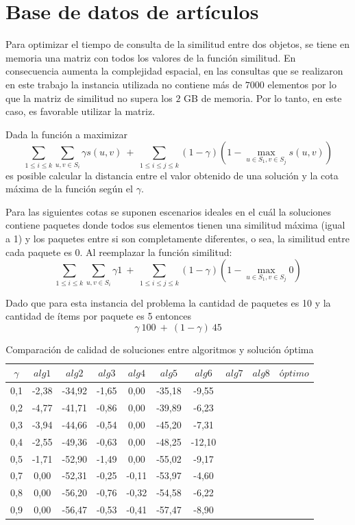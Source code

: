 \section{Base de datos de artículos}
Para optimizar el tiempo de consulta de la similitud entre dos objetos, se tiene en memoria una matriz con todos los valores de la función similitud. En consecuencia aumenta la complejidad espacial, en las consultas que se realizaron en este trabajo la instancia utilizada no contiene más de $7000$ elementos por lo que la matriz de similitud no supera los $2$ GB de memoria. Por lo tanto, en este caso, es favorable utilizar la matriz.

Dada la función a maximizar $$\displaystyle\sum_{1 \leq i \leq k} \displaystyle\sum_{u,v \in S_{i}} \gamma s(u,v)\ +\ \displaystyle\sum_{1 \leq i \leq j \leq k} (1-\gamma) (1 - \displaystyle\max_{u \in S_{1}, v \in S_{j}} s(u,v))$$ es posible calcular la distancia entre el valor obtenido de una solución y la cota máxima de la función según el $\gamma$.

Para las siguientes cotas se suponen escenarios ideales en el cuál la soluciones contiene paquetes donde todos sus elementos tienen una similitud máxima (igual a 1) y los paquetes entre si son completamente diferentes, o sea, la similitud entre cada paquete es 0. Al reemplazar la función similitud:
$$\displaystyle\sum_{1 \leq i \leq k} \displaystyle\sum_{u,v \in S_{i}} \gamma 1\ +\ \displaystyle\sum_{1 \leq i \leq j \leq k} (1-\gamma) (1 - \displaystyle\max_{u \in S_{1}, v \in S_{j}} 0)$$ 

Dado que para esta instancia del problema la cantidad de paquetes es 10 y la cantidad de ítems por paquete es 5 entonces  $$\displaystyle\gamma\ 100\ +\ (1-\gamma)\ 45$$


\begin{table}
\begin{center}
\begin{tabular}{|c|c|c|c|c|c|c|}
\hline
$\gamma$ &$alg1$&$alg2$&$alg3$&$alg4$&$alg5$&$alg6$&$alg7$&$alg8$&$óptimo$ \\
,1 & -2,38		&	-34,92 &		-1,65 &		0,00  &		-35,18    &	-9,55 \\
0,2 & -4,77		&	-41,71 &		-0,86	&		0,00	&		-39,89		&	-6,23 \\
0,3 & -3,94		&	-44,66 &		-0,54	&		0,00	&		-45,20		&	-7,31 \\
0,4 & -2,55		&	-49,36 &		-0,63	&		0,00	&		-48,25		&	-12,10\\
0,5 & -1,71		&	-52,90 &		-1,49	&		0,00	&		-55,02		&	-9,17 \\
0,7 & 0,00		&	-52,31 &		-0,25	&		-0,11	&		-53,97		&	-4,60 \\
0,8 & 0,00		&	-56,20 &		-0,76	&		-0,32	&		-54,58		&	-6,22 \\
0,9 & 0,00		&	-56,47 &		-0,53	&		-0,41	&		-57,47		&	-8,90 \\ \hline 
\end{tabular}
\caption{Comparaci\'on de calidad de soluciones entre algoritmos y solución óptima} 
\label{tabla:comp}
\end{center}
\end{table}






